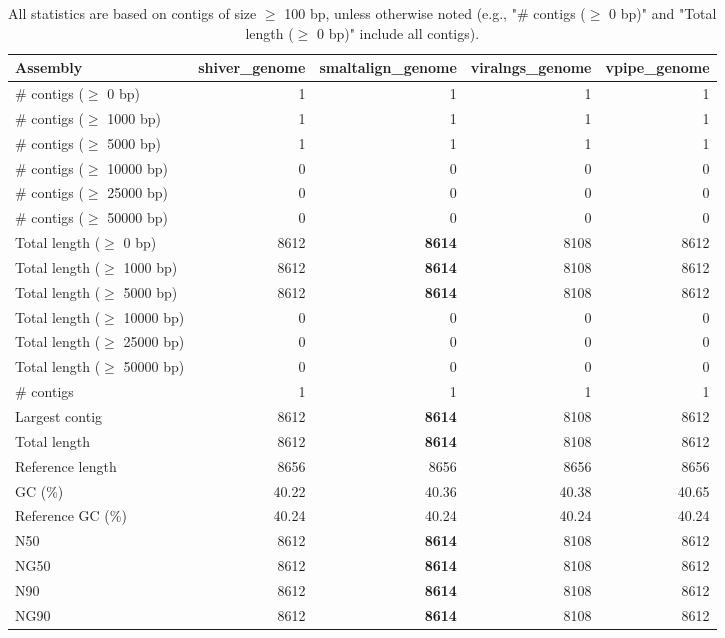 \documentclass[12pt,a4paper]{article}
\begin{document}
\begin{table}[ht]
\begin{center}
\caption{All statistics are based on contigs of size $\geq$ 100 bp, unless otherwise noted (e.g., "\# contigs ($\geq$ 0 bp)" and "Total length ($\geq$ 0 bp)" include all contigs).}
\begin{tabular}{|l*{4}{|r}|}
\hline
Assembly & shiver\_genome & smaltalign\_genome & viralngs\_genome & vpipe\_genome \\ \hline
\# contigs ($\geq$ 0 bp) & 1 & 1 & 1 & 1 \\ \hline
\# contigs ($\geq$ 1000 bp) & 1 & 1 & 1 & 1 \\ \hline
\# contigs ($\geq$ 5000 bp) & 1 & 1 & 1 & 1 \\ \hline
\# contigs ($\geq$ 10000 bp) & 0 & 0 & 0 & 0 \\ \hline
\# contigs ($\geq$ 25000 bp) & 0 & 0 & 0 & 0 \\ \hline
\# contigs ($\geq$ 50000 bp) & 0 & 0 & 0 & 0 \\ \hline
Total length ($\geq$ 0 bp) & 8612 & {\bf 8614} & 8108 & 8612 \\ \hline
Total length ($\geq$ 1000 bp) & 8612 & {\bf 8614} & 8108 & 8612 \\ \hline
Total length ($\geq$ 5000 bp) & 8612 & {\bf 8614} & 8108 & 8612 \\ \hline
Total length ($\geq$ 10000 bp) & 0 & 0 & 0 & 0 \\ \hline
Total length ($\geq$ 25000 bp) & 0 & 0 & 0 & 0 \\ \hline
Total length ($\geq$ 50000 bp) & 0 & 0 & 0 & 0 \\ \hline
\# contigs & 1 & 1 & 1 & 1 \\ \hline
Largest contig & 8612 & {\bf 8614} & 8108 & 8612 \\ \hline
Total length & 8612 & {\bf 8614} & 8108 & 8612 \\ \hline
Reference length & 8656 & 8656 & 8656 & 8656 \\ \hline
GC (\%) & 40.22 & 40.36 & 40.38 & 40.65 \\ \hline
Reference GC (\%) & 40.24 & 40.24 & 40.24 & 40.24 \\ \hline
N50 & 8612 & {\bf 8614} & 8108 & 8612 \\ \hline
NG50 & 8612 & {\bf 8614} & 8108 & 8612 \\ \hline
N90 & 8612 & {\bf 8614} & 8108 & 8612 \\ \hline
NG90 & 8612 & {\bf 8614} & 8108 & 8612 \\ \hline

\end{tabular}
\end{center}
\end{table}
\end{document}
